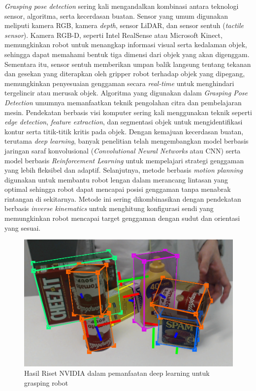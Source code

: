 \emph{Grasping pose detection} sering kali mengandalkan kombinasi antara teknologi sensor, algoritma, serta kecerdasan buatan.
Sensor yang umum digunakan meliputi kamera RGB, kamera \emph{depth}, sensor LiDAR, dan sensor sentuh (\emph{tactile sensor}).
Kamera RGB-D, seperti Intel RealSense atau Microsoft Kinect, memungkinkan robot untuk menangkap informasi visual serta kedalaman objek,
sehingga dapat memahami bentuk tiga dimensi dari objek yang akan digenggam. Sementara itu, sensor sentuh memberikan umpan balik langsung
tentang tekanan dan gesekan yang diterapkan oleh gripper robot terhadap objek yang dipegang, memungkinkan penyesuaian genggaman secara
\emph{real-time} untuk menghindari tergelincir atau merusak objek.
Algoritma yang digunakan dalam \emph{Grasping Pose Detection} umumnya memanfaatkan teknik pengolahan citra dan pembelajaran mesin.
Pendekatan berbasis visi komputer sering kali menggunakan teknik seperti \emph{edge detection}, \emph{feature extraction}, dan segmentasi objek
untuk mengidentifikasi kontur serta titik-titik kritis pada objek. Dengan kemajuan kecerdasan buatan, terutama \emph{deep learning}, banyak
penelitian telah mengembangkan model berbasis jaringan saraf konvolusional (\emph{Convolutional Neural Networks} atau CNN) serta model
berbasis \emph{Reinforcement Learning} untuk mempelajari strategi genggaman yang lebih fleksibel dan adaptif.
Selanjutnya, metode berbasis \emph{motion planning} digunakan untuk membantu robot lengan dalam
merancang lintasan yang optimal sehingga robot dapat mencapai posisi genggaman tanpa menabrak rintangan di sekitarnya.
Metode ini sering dikombinasikan dengan pendekatan berbasis \emph{inverse kinematics} untuk menghitung konfigurasi sendi yang
memungkinkan robot mencapai target genggaman dengan sudut dan orientasi yang sesuai.

\begin{figure} [H] \centering
    \includegraphics[scale=0.95]{gambar/grasping_pose_detection.png}
    \caption{Hasil Riset NVIDIA dalam pemanfaatan deep learning untuk grasping robot\parencite{img_grasping_daster}}
    \label{fig:grasping_daster}
\end{figure}

